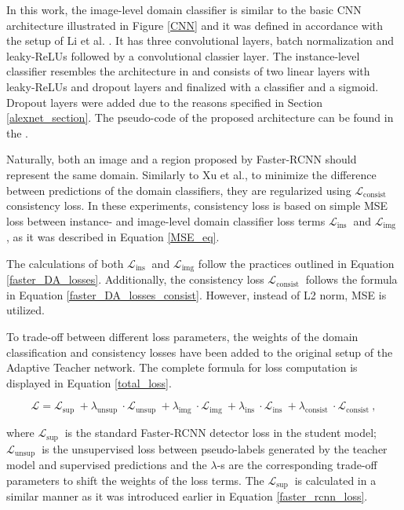 In this work, the image-level domain classifier is similar to the basic CNN architecture illustrated in Figure \ref{CNN} and it was defined in accordance with the setup of Li et al. \cite{Li2021}. It has three convolutional layers,  batch normalization and leaky-ReLUs followed by a convolutional classier layer. The instance-level classifier resembles the architecture in \cite{Xu2020} and consists of two linear layers with leaky-ReLUs and dropout layers and finalized with a classifier and a sigmoid. Dropout layers were added due to the reasons specified in Section \ref{alexnet_section}. The pseudo-code of the proposed architecture can be found in the . 

Naturally, both an image and a region proposed by Faster-RCNN should represent the same domain. Similarly to Xu et al., to minimize the difference between predictions of the domain classifiers, they are regularized using $\mathcal{L}_{\text {consist }}$ consistency loss. In these experiments, consistency loss is based on simple MSE loss between instance- and image-level domain classifier loss terms $\mathcal{L}_{\text {ins }}$ and $\mathcal{L}_{\text {img }}$, as it was described in Equation \ref{MSE_eq}.

The calculations of both $\mathcal{L}_{\text {ins }}$ and $\mathcal{L}_{\text {img}}$ follow the practices outlined in Equation \ref{faster_DA_losses}. Additionally,  the consistency loss $\mathcal{L}_{\text {consist }}$ follows the formula in Equation \ref{faster_DA_losses_consist}. However, instead of L2 norm, MSE is utilized.  

To trade-off between different loss parameters, the weights of the domain classification and consistency losses have been added to the original setup of the Adaptive Teacher network. The complete formula for loss computation is displayed in Equation \ref{total_loss}. 

\begin{equation}
\mathcal{L}=\mathcal{L}_{\text {sup }}+\lambda_{\text {unsup }} \cdot \mathcal{L}_{\text {unsup }}+\lambda_{\text {img }} \cdot \mathcal{L}_{\text {img }}+\lambda_{\text {ins }} \cdot \mathcal{L}_{\text {ins }}+\lambda_{\text {consist }} \cdot \mathcal{L}_{\text {consist }},
\label{total_loss} 
\end{equation}

where $\mathcal{L}_{\text {sup }}$ is the standard Faster-RCNN detector loss in the student model; $\mathcal{L}_{\text {unsup }}$ is the unsupervised loss between pseudo-labels generated by the teacher model and supervised predictions and the $\lambda$-s are the corresponding trade-off parameters to shift the weights of the loss terms. The $\mathcal{L}_{\text {sup }}$ is calculated in a similar manner as it was introduced earlier in Equation \ref{faster_rcnn_loss}. 
 
